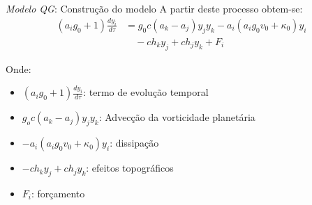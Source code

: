 \begin{frame}{\textit{Modelo QG}: Construção do modelo}
A partir deste processo obtem-se:
\begin{align}
    (a_ig_0 + 1)\frac{dy_i}{d\tau} &= g_0c(a_k - a_j)y_jy_k - a_i(a_ig_0v_0 + \kappa_0)y_i\nonumber \\ 
    &\quad - ch_ky_j + ch_jy_k + F_i \label{eq:qg-model}
\end{align}

	\begin{small}
		Onde:
			\begin{itemize}
                \item $(a_ig_0 + 1)\frac{dy_i}{d \tau}$: termo de evolução temporal
                \item $g_oc(a_k - a_j)y_jy_k$: Advecção da vorticidade planetária
                \item $-a_i(a_ig_0v_0 + \kappa_0)y_i$: dissipação
			    \item $- ch_ky_j + ch_jy_k$: efeitos topográficos
                \item $F_i$: forçamento
            \end{itemize}
	\end{small}
\end{frame}

